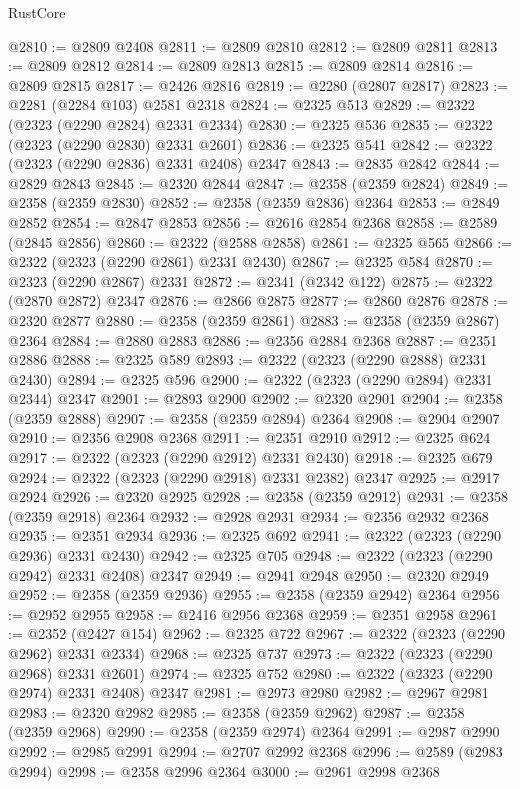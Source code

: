 \begin{lexlean}{RustCore}
\begin{coremodule}
@2810 := @2809 @2408
@2811 := @2809 @2810
@2812 := @2809 @2811
@2813 := @2809 @2812
@2814 := @2809 @2813
@2815 := @2809 @2814
@2816 := @2809 @2815
@2817 := @2426 @2816
@2819 := @2280 (@2807 @2817)
@2823 := @2281 (@2284 @103) @2581 @2318
@2824 := @2325 @513
@2829 := @2322 (@2323 (@2290 @2824) @2331 @2334)
@2830 := @2325 @536
@2835 := @2322 (@2323 (@2290 @2830) @2331 @2601)
@2836 := @2325 @541
@2842 := @2322 (@2323 (@2290 @2836) @2331 @2408) @2347
@2843 := @2835 @2842
@2844 := @2829 @2843
@2845 := @2320 @2844
@2847 := @2358 (@2359 @2824)
@2849 := @2358 (@2359 @2830)
@2852 := @2358 (@2359 @2836) @2364
@2853 := @2849 @2852
@2854 := @2847 @2853
@2856 := @2616 @2854 @2368
@2858 := @2589 (@2845 @2856)
@2860 := @2322 (@2588 @2858)
@2861 := @2325 @565
@2866 := @2322 (@2323 (@2290 @2861) @2331 @2430)
@2867 := @2325 @584
@2870 := @2323 (@2290 @2867) @2331
@2872 := @2341 (@2342 @122)
@2875 := @2322 (@2870 @2872) @2347
@2876 := @2866 @2875
@2877 := @2860 @2876
@2878 := @2320 @2877
@2880 := @2358 (@2359 @2861)
@2883 := @2358 (@2359 @2867) @2364
@2884 := @2880 @2883
@2886 := @2356 @2884 @2368
@2887 := @2351 @2886
@2888 := @2325 @589
@2893 := @2322 (@2323 (@2290 @2888) @2331 @2430)
@2894 := @2325 @596
@2900 := @2322 (@2323 (@2290 @2894) @2331 @2344) @2347
@2901 := @2893 @2900
@2902 := @2320 @2901
@2904 := @2358 (@2359 @2888)
@2907 := @2358 (@2359 @2894) @2364
@2908 := @2904 @2907
@2910 := @2356 @2908 @2368
@2911 := @2351 @2910
@2912 := @2325 @624
@2917 := @2322 (@2323 (@2290 @2912) @2331 @2430)
@2918 := @2325 @679
@2924 := @2322 (@2323 (@2290 @2918) @2331 @2382) @2347
@2925 := @2917 @2924
@2926 := @2320 @2925
@2928 := @2358 (@2359 @2912)
@2931 := @2358 (@2359 @2918) @2364
@2932 := @2928 @2931
@2934 := @2356 @2932 @2368
@2935 := @2351 @2934
@2936 := @2325 @692
@2941 := @2322 (@2323 (@2290 @2936) @2331 @2430)
@2942 := @2325 @705
@2948 := @2322 (@2323 (@2290 @2942) @2331 @2408) @2347
@2949 := @2941 @2948
@2950 := @2320 @2949
@2952 := @2358 (@2359 @2936)
@2955 := @2358 (@2359 @2942) @2364
@2956 := @2952 @2955
@2958 := @2416 @2956 @2368
@2959 := @2351 @2958
@2961 := @2352 (@2427 @154)
@2962 := @2325 @722
@2967 := @2322 (@2323 (@2290 @2962) @2331 @2334)
@2968 := @2325 @737
@2973 := @2322 (@2323 (@2290 @2968) @2331 @2601)
@2974 := @2325 @752
@2980 := @2322 (@2323 (@2290 @2974) @2331 @2408) @2347
@2981 := @2973 @2980
@2982 := @2967 @2981
@2983 := @2320 @2982
@2985 := @2358 (@2359 @2962)
@2987 := @2358 (@2359 @2968)
@2990 := @2358 (@2359 @2974) @2364
@2991 := @2987 @2990
@2992 := @2985 @2991
@2994 := @2707 @2992 @2368
@2996 := @2589 (@2983 @2994)
@2998 := @2358 @2996 @2364
@3000 := @2961 @2998 @2368

\end{coremodule}
\end{lexlean}
